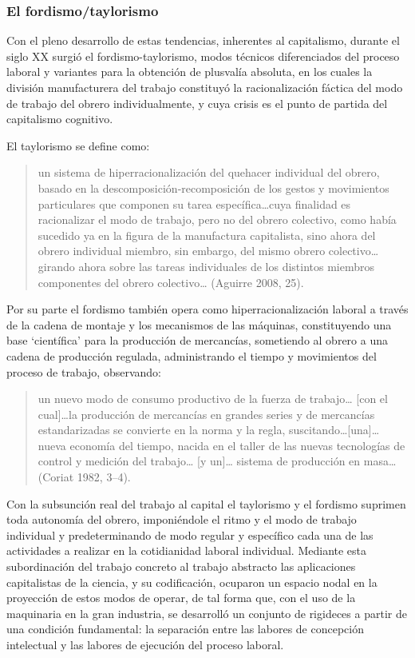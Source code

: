 \documentclass[
]{interact}
\begin{document}
\subsubsection{El fordismo/taylorismo}\label{el-fordismotaylorismo}

Con el pleno desarrollo de estas tendencias, inherentes al capitalismo,
durante el siglo XX surgió el fordismo-taylorismo, modos técnicos
diferenciados del proceso laboral y variantes para la obtención de
plusvalía absoluta, en los cuales la división manufacturera del trabajo
constituyó la racionalización fáctica del modo de trabajo del obrero
individualmente, y cuya crisis es el punto de partida del capitalismo
cognitivo.

El taylorismo se define como:

\begin{quote}
un sistema de hiperracionalización del quehacer individual del obrero,
basado en la descomposición-recomposición de los gestos y movimientos
particulares que componen su tarea específica\ldots cuya finalidad es
racionalizar el modo de trabajo, pero no del obrero colectivo, como
había sucedido ya en la figura de la manufactura capitalista, sino ahora
del obrero individual miembro, sin embargo, del mismo obrero
colectivo\ldots girando ahora sobre las tareas individuales de los
distintos miembros componentes del obrero colectivo\ldots{} (Aguirre
2008, 25).
\end{quote}

Por su parte el fordismo también opera como hiperracionalización laboral
a través de la cadena de montaje y los mecanismos de las máquinas,
constituyendo una base `científica' para la producción de mercancías,
sometiendo al obrero a una cadena de producción regulada, administrando
el tiempo y movimientos del proceso de trabajo, observando:

\begin{quote}
un nuevo modo de consumo productivo de la fuerza de trabajo\ldots{}
{[}con el cual{]}\ldots la producción de mercancías en grandes series y
de mercancías estandarizadas se convierte en la norma y la regla,
suscitando\ldots{[}una{]}\ldots{} nueva economía del tiempo, nacida en
el taller de las nuevas tecnologías de control y medición del
trabajo\ldots{} {[}y un{]}\ldots{} sistema de producción en
masa\ldots{}(Coriat 1982, 3--4).
\end{quote}

Con la subsunción real del trabajo al capital el taylorismo y el
fordismo suprimen toda autonomía del obrero, imponiéndole el ritmo y el
modo de trabajo individual y predeterminando de modo regular y
específico cada una de las actividades a realizar en la cotidianidad
laboral individual. Mediante esta subordinación del trabajo concreto al
trabajo abstracto las aplicaciones capitalistas de la ciencia, y su
codificación, ocuparon un espacio nodal en la proyección de estos modos
de operar, de tal forma que, con el uso de la maquinaria en la gran
industria, se desarrolló un conjunto de rigideces a partir de una
condición fundamental: la separación entre las labores de concepción
intelectual y las labores de ejecución del proceso laboral.
\end{document}

